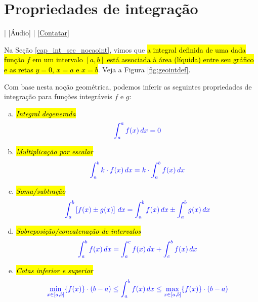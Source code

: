 \section{Propriedades de integração}\label{cap_int_sec_propint}

\begin{flushright}
  [Vídeo] | [Áudio] | \href{https://phkonzen.github.io/notas/contato.html}{[Contatar]}
\end{flushright}

Na Seção \ref{cap_int_sec_nocaoint}, vimos que \hl{a integral definida de uma dada função $f$ em um intervalo $[a, b]$ está associada à área (líquida) entre seu gráfico e as retas $y=0$, $x=a$ e $x=b$}. Veja a Figura \ref{fig:geointdef}.

Com base nesta noção geométrica, podemos inferir as seguintes propriedades de integração para funções integráveis $f$ e $g$:
\begin{enumerate}[a)]
\item \hl{\emph{Integral degenerada}}
  \begin{equation}\color{blue}\int_a^a f(x)\,dx = 0
  \end{equation}
\item \hl{\emph{Multiplicação por escalar}}
  \begin{equation}\color{blue}\int_a^b k\cdot f(x)\,dx = k\cdot\int_a^b f(x)\,dx
  \end{equation}
\item \hl{\emph{Soma/subtração}}
  \begin{equation}\color{blue}\int_a^b \left[f(x)\pm g(x)\right]\,dx = \int_a^b f(x)\,dx \pm \int_a^b g(x)\,dx
  \end{equation}
\item \hl{\emph{Sobreposição/concatenação de intervalos}}
  \begin{equation}\color{blue}\int_a^b f(x)\,dx = \int_a^c f(x)\,dx + \int_c^b f(x)\,dx
  \end{equation}
\item \hl{\emph{Cotas inferior e superior}}
  \begin{equation}\color{blue}\min_{x\in [a, b]} \{f(x)\}\cdot (b-a) \leq \int_a^b f(x)\,dx \leq \max_{x\in [a, b]} \{f(x)\}\cdot (b-a)
  \end{equation}
\end{enumerate}

